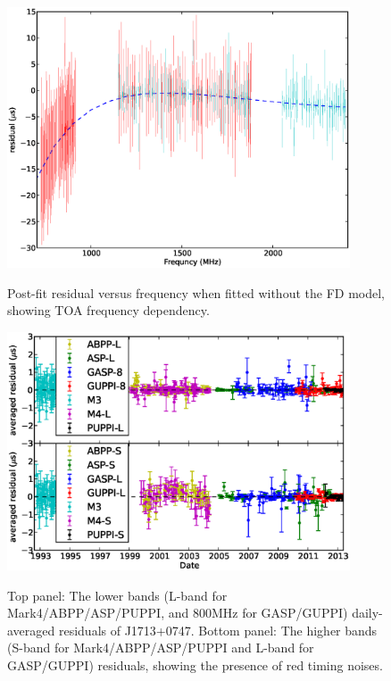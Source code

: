 \documentclass[12pt,preprint]{aastex}
\begin{document}
\begin{figure}
\includegraphics[width=4in]{FD.ps} \\ 
\caption {\label{fig:FD} Post-fit residual versus frequency when fitted
without the FD model, showing TOA frequency dependency.} 
\end{figure} 

\begin{figure}
\includegraphics[width=4in]{residual.eps} \\ 
\caption {\label{fig:res} Top panel: The lower bands (L-band for
Mark4/ABPP/ASP/PUPPI, and 800MHz for GASP/GUPPI) daily-averaged residuals of
J1713+0747. Bottom panel: The higher bands (S-band for Mark4/ABPP/ASP/PUPPI and
L-band for GASP/GUPPI) residuals, showing the presence of red timing noises.} 
\end{figure} 
\end{document}
